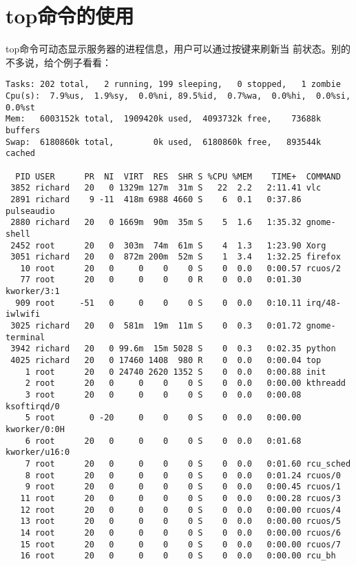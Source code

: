 
\section{top命令的使用}
\label{sec:topCmd}

top命令可动态显示服务器的进程信息，用户可以通过按键来刷新当
前状态。别的不多说，给个例子看看：

\begin{verbatim}
Tasks: 202 total,   2 running, 199 sleeping,   0 stopped,   1 zombie
Cpu(s):  7.9%us,  1.9%sy,  0.0%ni, 89.5%id,  0.7%wa,  0.0%hi,  0.0%si,  0.0%st
Mem:   6003152k total,  1909420k used,  4093732k free,    73688k buffers
Swap:  6180860k total,        0k used,  6180860k free,   893544k cached

  PID USER      PR  NI  VIRT  RES  SHR S %CPU %MEM    TIME+  COMMAND                                                   
 3852 richard   20   0 1329m 127m  31m S   22  2.2   2:11.41 vlc                                                                 
 2891 richard    9 -11  418m 6988 4660 S    6  0.1   0:37.86 pulseaudio 
 2880 richard   20   0 1669m  90m  35m S    5  1.6   1:35.32 gnome-shell
 2452 root      20   0  303m  74m  61m S    4  1.3   1:23.90 Xorg
 3051 richard   20   0  872m 200m  52m S    1  3.4   1:32.25 firefox
   10 root      20   0     0    0    0 S    0  0.0   0:00.57 rcuos/2
   77 root      20   0     0    0    0 R    0  0.0   0:01.30 kworker/3:1
  909 root     -51   0     0    0    0 S    0  0.0   0:10.11 irq/48-iwlwifi
 3025 richard   20   0  581m  19m  11m S    0  0.3   0:01.72 gnome-terminal
 3942 richard   20   0 99.6m  15m 5028 S    0  0.3   0:02.35 python
 4025 richard   20   0 17460 1408  980 R    0  0.0   0:00.04 top
    1 root      20   0 24740 2620 1352 S    0  0.0   0:00.88 init
    2 root      20   0     0    0    0 S    0  0.0   0:00.00 kthreadd
    3 root      20   0     0    0    0 S    0  0.0   0:00.08 ksoftirqd/0
    5 root       0 -20     0    0    0 S    0  0.0   0:00.00 kworker/0:0H                                                                            
    6 root      20   0     0    0    0 S    0  0.0   0:01.68 kworker/u16:0
    7 root      20   0     0    0    0 S    0  0.0   0:01.60 rcu_sched
    8 root      20   0     0    0    0 S    0  0.0   0:01.24 rcuos/0
    9 root      20   0     0    0    0 S    0  0.0   0:00.45 rcuos/1
   11 root      20   0     0    0    0 S    0  0.0   0:00.28 rcuos/3
   12 root      20   0     0    0    0 S    0  0.0   0:00.00 rcuos/4
   13 root      20   0     0    0    0 S    0  0.0   0:00.00 rcuos/5
   14 root      20   0     0    0    0 S    0  0.0   0:00.00 rcuos/6
   15 root      20   0     0    0    0 S    0  0.0   0:00.00 rcuos/7
   16 root      20   0     0    0    0 S    0  0.0   0:00.00 rcu_bh
\end{verbatim}